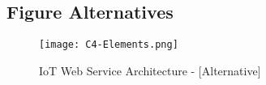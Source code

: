 \subsection{Figure Alternatives}
\begin{figure}[]
    \centering
    \texttt{[image: C4-Elements.png]}
    \caption{IoT Web Service Architecture - [Alternative]}\label{fig::arch}
\end{figure}